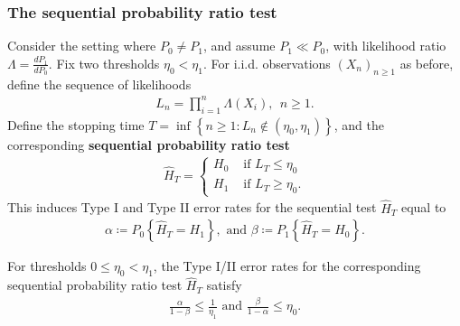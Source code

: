 
\subsubsection{The sequential probability ratio test}

\begin{defn}{}{}
    Consider the setting where \(P_0 \neq P_1\), and assume \(P_1 \ll P _0\), with likelihood ratio \(\Lambda = \frac{dP_1}{dP_0} .\) Fix two thresholds \(\eta _0 < \eta _1\). For i.i.d. observations \((X_{n} )_{n \geq 1}\) as before, define the sequence of likelihoods
    \begin{align*}
        L_{n} = \prod_{i=1}^{n} \Lambda (X_{i} ), \ \  n \geq 1. 
    \end{align*}
    Define the stopping time \(T = \inf \left\{ n \geq 1:L_{n} \notin (\eta _0, \eta _1) \right\} \), and the corresponding \textbf{sequential probability ratio test}
    \begin{align*}
        \hat{H} _{T} = \begin{cases}
            H_0&  \text{ if } L_{T} \leq \eta _0\\
            H_1&  \text{ if } L_{T} \geq \eta _0.
        \end{cases}
    \end{align*}
    This induces Type I and Type II error rates for the sequential test \(\hat{H} _{T} \) equal to 
\begin{align*}
    \alpha \coloneqq P_0 \left\{ \hat{H} _{T} = H_1 \right\}, \text{ and } \beta \coloneqq P_1 \left\{ \hat{H} _{T} = H_ 0 \right\}.
\end{align*}
\end{defn}

\begin{idea}{}{}
For thresholds \(0\leq \eta _0< \eta _1\), the Type I/II error rates for the corresponding sequential probability ratio test \(\hat{H} _{T} \) satisfy
\begin{align*}
    \frac{\alpha }{1 -\beta }\leq \frac{1}{\eta _1} \text{ and } \frac{\beta }{1 - \alpha } \leq \eta _0. 
\end{align*}

\end{idea}

